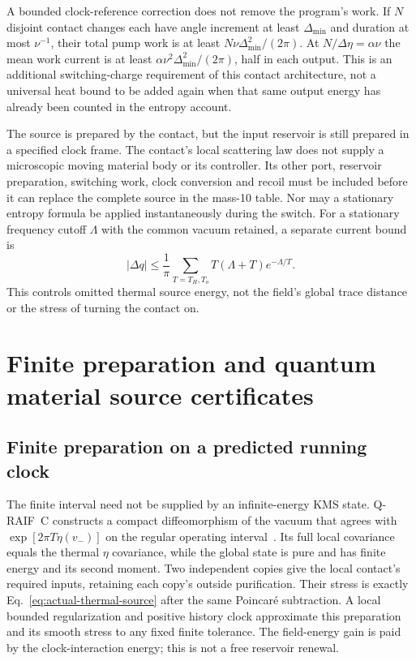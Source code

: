 A bounded clock-reference correction does not remove the program's
work. If $N$ disjoint contact changes each have angle increment at least
$\Delta_{\min}$ and duration at most $\nu^{-1}$, their total pump
work is at least $N\nu\Delta_{\min}^2/(2\pi)$.
At $N/\Delta\eta=\alpha\nu$ the mean work current is at least
$\alpha\nu^2\Delta_{\min}^2/(2\pi)$, half in each output.
This is an additional switching-charge requirement of this contact
architecture, not a universal heat bound to be added again when that
same output energy has already been counted in the entropy account.

The source is prepared by the contact, but the input reservoir is still
prepared in a specified clock frame. The contact's local scattering law
does not supply a microscopic moving material body or its controller.
Its other port, reservoir preparation, switching work, clock conversion
and recoil must be included before it can replace the complete source
in the mass-10 table. Nor may a stationary entropy formula be applied
instantaneously during the switch. For a stationary frequency cutoff
$\Lambda$ with the common vacuum retained, a separate current bound is
\[
 |\Delta q|\le\frac1\pi\sum_{T=T_H,T_o}
                  T(\Lambda+T)e^{-\Lambda/T}.
\]
This controls omitted thermal source energy, not the field's global
trace distance or the stress of turning the contact on.


\section{Finite preparation and quantum material source certificates}
\label{app:material-certificates}

\subsection{Finite preparation on a predicted running clock}
\label{sec:finite-thermal-preparation}

The finite interval need not be supplied by an infinite-energy KMS
state. Q-RAIF~C constructs a compact diffeomorphism of the vacuum
that agrees with $\exp[2\pi T\eta(v_-)]$ on the regular operating
interval~\cite[Section on thermal correlations from a finite-energy
preparation]{QRC}. Its full local covariance equals the thermal
$\eta$ covariance, while the global state is pure and has finite
energy and its second moment. Two independent copies give the local
contact's required inputs, retaining each copy's outside purification.
Their stress is exactly Eq.~\eqref{eq:actual-thermal-source} after
the same Poincar\'e subtraction. A local bounded regularization and
positive history clock approximate this preparation and its smooth
stress to any fixed finite tolerance. The field-energy gain is paid
by the clock-interaction energy; this is not a free reservoir renewal.

